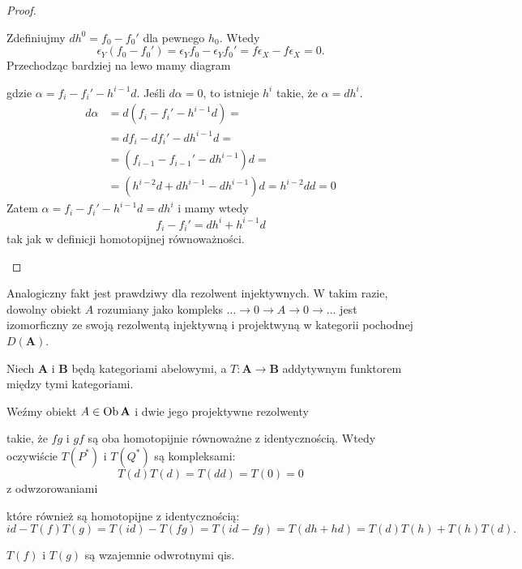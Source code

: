 \begin{proof}
\begin{enumerate}[label=(\alph*)]
    Zdefiniujmy $dh^0=f_0-f_0'$ dla pewnego $h_0$. Wtedy
    $$\epsilon_Y(f_0-f_0')=\epsilon_Yf_0-\epsilon_Yf_0'=f\epsilon_X-f\epsilon_X=0.$$
    Przechodząc bardziej na lewo mamy diagram
    \begin{center}\end{center}
    gdzie $\alpha=f_i-f_i'-h^{i-1}d$. Jeśli $d\alpha=0$, to istnieje $h^i$ takie, że $\alpha=d h^i$.
    \begin{align*}
      d\alpha&=d(f_i-f_i'-h^{i-1}d)=\\ 
             &=df_i-df_i'-dh^{i-1}d=\\ 
             &=(f_{i-1}-f_{i-1}'-dh^{i-1})d=\\ 
             &=(h^{i-2}d+dh^{i-1}-dh^{i-1})d=h^{i-2}dd=0
    \end{align*}
    Zatem $\alpha=f_i-f_i'-h^{i-1}d=dh^i$ i mamy wtedy
    $$f_i-f_i'=dh^i+h^{i-1}d$$
    tak jak w definicji homotopijnej równoważności.
\end{enumerate}
\end{proof}

Analogiczny fakt jest prawdziwy dla rezolwent injektywnych. W takim razie, dowolny obiekt $A$ rozumiany jako kompleks $...\to 0\to A\to 0\to...$ jest izomorficzny ze swoją rezolwentą injektywną i projektwyną w kategorii pochodnej $D(\mathbf{A})$.

\begin{example}
\item Niech $\mathbf{A}$ i $\mathbf{B}$ będą kategoriami abelowymi, a $T:\mathbf{A}\to \mathbf{B}$ addytywnym funktorem między tymi kategoriami.

  Weźmy obiekt $A\in\operatorname{Ob}\mathbf{A}$ i dwie jego projektywne rezolwenty  takie, że $fg$ i $gf$ są oba homotopijnie równoważne z identycznością. Wtedy oczywiście $T(P^*)$ i $T(Q^*)$ są kompleksami:
  $$T(d)T(d)=T(dd)=T(0)=0$$
  z odwzorowaniami  które również są homotopijne z identycznością:
  $$id-T(f)T(g)=T(id)-T(fg)=T(id-fg)=T(dh+hd)=T(d)T(h)+T(h)T(d).$$
  
  \begin{conclusion}
    $T(f)$ i $T(g)$ są wzajemnie odwrotnymi qis.
  \end{conclusion}
\end{example}

